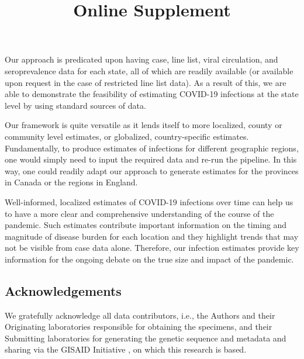 \documentclass{article}
\newcommand{\beginsupplement}{
  \setcounter{table}{0}  
  \renewcommand{\thetable}{S\arabic{table}} 
  \setcounter{figure}{0} 
  \renewcommand{\thefigure}{S\arabic{figure}}
  \setcounter{section}{0} 
  \renewcommand{\thesection}{S\arabic{section}}
}
\begin{document}
Our approach is predicated upon having case, line list, viral circulation, and
seroprevalence data for each state, all of which are readily available (or
available upon request in the case of restricted line list data). As a result of
this, we are able to demonstrate the feasibility of estimating COVID-19
infections at the state level by using standard sources of data. 

Our framework is quite versatile as it lends itself to more localized, county or
community level estimates, or globalized, country-specific estimates.
Fundamentally, to produce estimates of infections for different geographic
regions, one would simply need to input the required data and re-run the
pipeline. In this way, one could readily adapt our approach to generate
estimates for the provinces in Canada or the regions in England.

Well-informed, localized estimates of COVID-19 infections over time can help us
to have a more clear and comprehensive understanding of the course of the
pandemic. Such estimates contribute important information on the timing and
magnitude of disease burden for each location and they highlight trends that may
not be visible from case data alone. Therefore, our infection estimates provide
key information for the ongoing debate on the true size and impact of the
pandemic.



\subsection*{Acknowledgements}

We gratefully acknowledge all data contributors, i.e., the Authors and their
Originating laboratories responsible for obtaining the specimens, and their
Submitting laboratories for generating the genetic sequence and metadata and
sharing via the GISAID Initiative \citep{elbe2017data}, on which this research
is based.



\newpage


\newpage
\beginsupplement
\title{\supptitlefont Online Supplement}
\maketitle
\end{document}
